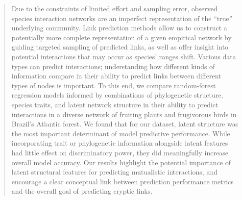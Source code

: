 \documentclass[openacc]{rsproca_new}%
\begin{document}
% 
% 
% 
\begin{abstract}
Due to the constraints of limited effort and sampling error, observed species interaction networks are an imperfect representation of the ``true'' underlying community. Link prediction methods allow us to construct a potentially more complete representation of a given empirical network by guiding targeted sampling of predicted links, as well as offer insight into potential interactions that may occur as species' ranges shift. Various data types can predict interactions; understanding how different kinds of information compare in their ability to predict links between different types of nodes is important. To this end, we compare random-forest regression models informed by combinations of phylogenetic structure, species traits, and latent network structure in their ability to predict interactions in a diverse network of fruiting plants and frugivorous birds in Brazil's Atlantic forest. We found that for our dataset, latent structure was the most important determinant of model predictive performance. While incorporating trait or phylogenetic information alongside latent features had little effect on discriminatory power, they did meaningfully increase overall model accuracy. Our results highlight the potential importance of latent structural features for predicting mutualistic interactions, and encourage a clear conceptual link between prediction performance metrics and the overall goal of predicting cryptic links.




\end{abstract}
\end{document}
